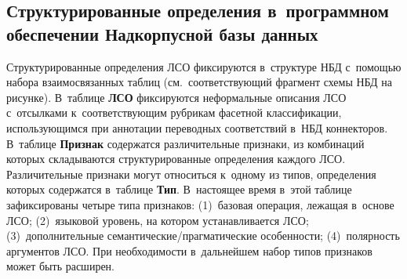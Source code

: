 \begin{multicols}{2}
\section{Структурированные определения в~программном 
обеспечении Надкорпусной базы данных}

\vspace*{-14pt}
   
   Структурированные определения ЛСО фиксируются в~структуре НБД 
   с~по\-мощью набора взаимосвязанных таблиц (см.\ соответствующий фрагмент 
схемы НБД на рисунке). В~таблице \textbf{ЛСО} фиксируются неформальные 
описания ЛСО с~отсылками к~соответствующим рубрикам фасетной 
классификации, использующимся при аннотации переводных соответствий 
в~НБД коннекторов. В~таблице \textbf{Признак} содержатся различительные 
признаки, из комбинаций которых складываются структурированные 
определения каждого ЛСО. Различительные признаки могут относиться 
к~одному из типов, определения которых содержатся в~таблице \textbf{Тип}. 
В~настоящее время в~этой таблице зафиксированы четыре типа признаков: 
(1)~базовая операция, лежащая в~основе ЛСО; (2)~языковой уровень, на 
котором устанавливается ЛСО; (3)~дополнительные  
се\-ман\-ти\-че\-ские/праг\-ма\-ти\-че\-ские особенности; (4)~полярность 
аргументов ЛСО. При не\-об\-хо\-ди\-мости в~дальнейшем набор типов признаков 
может быть расширен.

\begin{table*}\small %
\begin{center}
\vspace*{2ex}


\end{center}
\end{table*}
\end{multicols}
